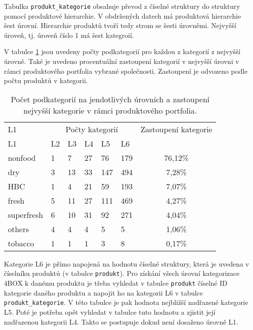 Tabulka \texttt{produkt\_kategorie} obsahuje převod z číselné struktury do struktury pomocí produktové hierarchie. V obdržených datech má produktová hierarchie šest úrovní. Hierarchie produktů tvoří tedy strom se šesti úrovněmi. Nejvyšší úroveň, tj. úroveň číslo 1 má šest kategroií.

V tabulce \ref*{tab:d:4Bzast} jsou uvedeny počty podkategorií pro každou z kategorií z nejvyšší úrovně. Také je uvedeno procentuální zastoupení kategorií v nejvyšší úrovni v rámci produktového portfolia vybrané společnosti. Zastoupení je odvozeno podle počtu produktů v kategorii.

\begin{table}[hbtp!]
    \captionsetup{justification=centering}
    \begin{center}
    \caption{Počet podkategorií na jendotlivých úrovních a zastoupení \\ nejvyšší kategorie v rámci produktového portfolia.}
    \label{tab:d:4Bzast}
    \begin{tabular}{p{3cm}  p{1cm} p{1cm} p{1cm} p{1cm} p{1cm}  c}
        L1 & \multicolumn{5}{c}{Počty kategorií} &      Zastoupení kategorie                \\
        L1       & L2    & L3   & L4   & L5    & L6    &  \\
        \hline
        nonfood    & 1     & 7    & 27   & 76    & 179   & 76,12\%              \\
        dry         & 3     & 13   & 33   & 147   & 494   & 7,28\%               \\
        HBC        & 1     & 4    & 21   & 59    & 193   & 7,07\%               \\
        fresh       & 5     & 11   & 27   & 111   & 469   & 4,27\%               \\
        superfresh & 6     & 10   & 31   & 92    & 271   & 4,04\%               \\
        others     & 4     & 4    & 4    & 5     & 5     & 1,06\%               \\
        tobacco    & 1     & 1    & 1    & 3     & 8     & 0,17\%            
    \end{tabular}
    \end{center}
    \end{table}

Kategorie L6 je přímo napojená na hodnotu číselné struktury, která je uvedena v číselníku produktů (v tabulce \texttt{produkt}). Pro získání všech úrovní kategorizace 4BOX k danému produktu je třeba vyhledat v tabulce \texttt{produkt} číselné ID kategorie daného produktu a napojit ho na kategorii L6 v tabulce \texttt{produkt\_kategorie}. V této tabulce je pak hodnota nejbližší nadřazené kategorie L5. Poté je potřeba opět vyhledat v tabulce tuto hodnotu a zjistit její nadřazenou kategorii L4. Takto se postupuje dokud není dosaženo úrovně L1. 

